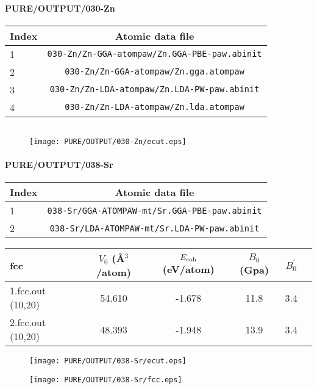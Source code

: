\documentclass[onecolumn]{revtex4}
\begin{document}
\paragraph*{\bf{PURE/OUTPUT/030-Zn}}
\begin{center}
\begin{tabular}{lc}
\hline
Index & Atomic data file \\
\hline
1 & \verb?030-Zn/Zn-GGA-atompaw/Zn.GGA-PBE-paw.abinit?\\
2 & \verb?030-Zn/Zn-GGA-atompaw/Zn.gga.atompaw?\\
3 & \verb?030-Zn/Zn-LDA-atompaw/Zn.LDA-PW-paw.abinit?\\
4 & \verb?030-Zn/Zn-LDA-atompaw/Zn.lda.atompaw?\\
\hline
\end{tabular}
\end{center}
\begin{center}
\begin{tabular}{lccccc}
\hline
\hline
\end{tabular}
\end{center}
\begin{figure}[h] 
\centering 
\texttt{[image: PURE/OUTPUT/030-Zn/ecut.eps]}
\end{figure}
\newpage
\paragraph*{\bf{PURE/OUTPUT/038-Sr}}
\begin{center}
\begin{tabular}{lc}
\hline
Index & Atomic data file \\
\hline
1 & \verb?038-Sr/GGA-ATOMPAW-mt/Sr.GGA-PBE-paw.abinit?\\
2 & \verb?038-Sr/LDA-ATOMPAW-mt/Sr.LDA-PW-paw.abinit?\\
\hline
\end{tabular}
\end{center}
\begin{center}
\begin{tabular}{lccccc}
\hline
\hline
\bf{fcc}&$V_0$ (\AA$^3$/atom)&$E_{\rm coh}$ (eV/atom)&$B_0$ (Gpa)&$B_0^{'}$& \\
\hline
1.fcc.out (10,20)& 54.610 &-1.678 & 11.8 & 3.4 & \\ 
2.fcc.out (10,20)& 48.393 &-1.948 & 13.9 & 3.4 & \\ 
\hline
\hline
\end{tabular}
\end{center}
\begin{figure}[h] 
\centering 
\texttt{[image: PURE/OUTPUT/038-Sr/ecut.eps]}
\end{figure}
\begin{figure}[h] 
\centering 
\texttt{[image: PURE/OUTPUT/038-Sr/fcc.eps]}
\end{figure}
\newpage
\end{document}
